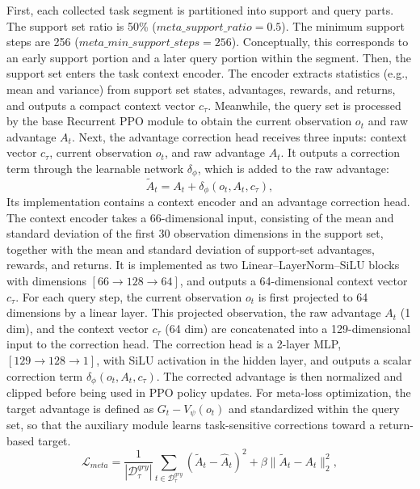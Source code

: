 \documentclass[number,preprint,review,12pt]{elsarticle}
\begin{document}
First, each collected task segment is partitioned into support and query parts. The support set ratio is 50\% ($\mathit{meta\_support\_ratio}=0.5$). The minimum support steps are 256 ($\mathit{meta\_min\_support\_steps}=256$). Conceptually, this corresponds to an early support portion and a later query portion within the segment. Then, the support set enters the task context encoder. The encoder extracts statistics (e.g., mean and variance) from support set states, advantages, rewards, and returns, and outputs a compact context vector $c_{\tau}$. Meanwhile, the query set is processed by the base Recurrent PPO module to obtain the current observation $o_t$ and raw advantage $A_t$. Next, the advantage correction head receives three inputs: context vector $c_{\tau}$, current observation $o_t$, and raw advantage $A_t$. It outputs a correction term through the learnable network $\delta_{\phi}$, which is added to the raw advantage:
\begin{equation}
\tilde{A}_t = A_t + \delta_{\phi}(o_t, A_t, c_{\tau}),
\end{equation}
Its implementation contains a context encoder and an advantage correction head. The context encoder takes a 66-dimensional input, consisting of the mean and standard deviation of the first 30 observation dimensions in the support set, together with the mean and standard deviation of support-set advantages, rewards, and returns. It is implemented as two Linear--LayerNorm--SiLU blocks with dimensions $[66 \to 128 \to 64]$, and outputs a 64-dimensional context vector $c_{\tau}$. For each query step, the current observation $o_t$ is first projected to 64 dimensions by a linear layer. This projected observation, the raw advantage $A_t$ (1 dim), and the context vector $c_{\tau}$ (64 dim) are concatenated into a 129-dimensional input to the correction head. The correction head is a 2-layer MLP, $[129 \to 128 \to 1]$, with SiLU activation in the hidden layer, and outputs a scalar correction term $\delta_{\phi}(o_t, A_t, c_{\tau})$. The corrected advantage is then normalized and clipped before being used in PPO policy updates. For meta-loss optimization, the target advantage is defined as $G_t - V_\psi(o_t)$ and standardized within the query set, so that the auxiliary module learns task-sensitive corrections toward a return-based target.
\begin{equation}
\mathcal{L}_{meta} = \frac{1}{|\mathcal{D}_{\tau}^{qry}|}\sum_{t \in \mathcal{D}_{\tau}^{qry}} (\tilde{A}_t - \hat{A}_t)^2 + \beta \|\tilde{A}_t - A_t\|_2^2,
\end{equation}
\end{document}
